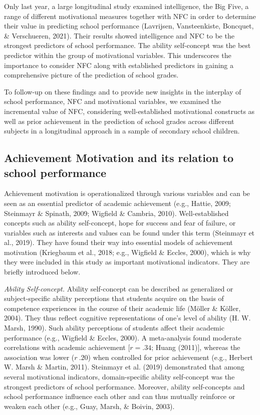 \documentclass[
  man]{apa6}
\begin{document}
Only last year, a large longitudinal study examined intelligence, the Big Five, a range of different motivational measures together with NFC in order to determine their value in predicting school performance (Lavrijsen, Vansteenkiste, Boncquet, \& Verschueren, 2021). Their results showed intelligence and NFC to be the strongest predictors of school performance. The ability self-concept was the best predictor within the group of motivational variables. This underscores the importance to consider NFC along with established predictors in gaining a comprehensive picture of the prediction of school grades.

To follow-up on these findings and to provide new insights in the interplay of school performance, NFC and motivational variables, we examined the incremental value of NFC, considering well-established motivational constructs as well as prior achievement in the prediction of school grades across different subjects in a longitudinal approach in a sample of secondary school children.

\hypertarget{achievement-motivation-and-its-relation-to-school-performance}{%
\subsection{Achievement Motivation and its relation to school performance}\label{achievement-motivation-and-its-relation-to-school-performance}}

Achievement motivation is operationalized through various variables and can be seen as an essential predictor of academic achievement (e.g., Hattie, 2009; Steinmayr \& Spinath, 2009; Wigfield \& Cambria, 2010). Well-established concepts such as ability self-concept, hope for success and fear of failure, or variables such as interests and values can be found under this term (Steinmayr et al., 2019). They have found their way into essential models of achievement motivation (Kriegbaum et al., 2018; e.g., Wigfield \& Eccles, 2000), which is why they were included in this study as important motivational indicators. They are briefly introduced below.

\emph{Ability Self-concept.} Ability self-concept can be described as generalized or subject-specific ability perceptions that students acquire on the basis of competence experiences in the course of their academic life (Möller \& Köller, 2004). They thus reflect cognitive representations of one's level of ability (H. W. Marsh, 1990). Such ability perceptions of students affect their academic performance (e.g., Wigfield \& Eccles, 2000). A meta-analysis found moderate correlations with academic achievement {[}\(r=.34\); Huang (2011){]}, whereas the association was lower (\(r~.20\)) when controlled for prior achievement (e.g., Herbert W. Marsh \& Martin, 2011). Steinmayr et al. (2019) demonstrated that among several motivational indicators, domain-specific ability self-concept was the strongest predictors of school performance. Moreover, ability self-concepts and school performance influence each other and can thus mutually reinforce or weaken each other (e.g., Guay, Marsh, \& Boivin, 2003).
\end{document}
